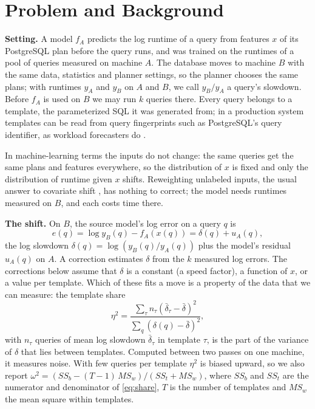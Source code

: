 \documentclass[conference]{IEEEtran}
\begin{document}
\section{Problem and Background}
\label{sec:problem}

\textbf{Setting.} A model $f_A$ predicts the log runtime of a query from
features $x$ of its PostgreSQL plan before the query runs, and was trained
on the runtimes of a pool of queries measured on machine $A$. The database
moves to machine $B$ with the same data, statistics and planner settings, so
the planner chooses the same plans; with runtimes $y_A$ and $y_B$ on $A$
and $B$, we call $y_B/y_A$ a query's slowdown.
Before $f_A$ is used on $B$ we may run $k$ queries there. Every query
belongs to a template, the parameterized SQL it was generated from; in a
production system templates can be read from query fingerprints such as
PostgreSQL's query identifier, as workload forecasters do
\cite{ma2018querybot}.

In machine-learning terms the inputs do not change: the same queries get
the same plans and features everywhere, so the distribution of $x$ is fixed
and only the distribution of runtime given $x$ shifts. Reweighting
unlabeled inputs, the usual answer to covariate shift
\cite{shimodaira2000}, has nothing to correct; the model needs runtimes
measured on $B$, and each costs time there.

\textbf{The shift.} On $B$, the source model's log error on a query $q$ is
\begin{equation}
e(q) = \log y_B(q) - f_A(x(q)) = \delta(q) + u_A(q),
\label{eq:error}
\end{equation}
the log slowdown $\delta(q) = \log(y_B(q)/y_A(q))$ plus the model's
residual $u_A(q)$ on $A$. A correction estimates $\delta$ from the $k$
measured log errors. The corrections below assume that $\delta$ is a constant
(a speed factor), a function of $x$, or a value per template. Which of
these fits a move is a property of the data that we can measure: the
template share
\begin{equation}
\eta^2 = \frac{\sum_{\tau} n_\tau(\bar\delta_\tau-\bar\delta)^2}{\sum_q(\delta(q)-\bar\delta)^2},
\label{eq:share}
\end{equation}
with $n_\tau$ queries of mean log slowdown $\bar\delta_\tau$ in template
$\tau$, is the part of the variance of $\delta$ that lies between
templates. Computed between two passes on one machine, it measures noise.
With few queries per template $\eta^2$ is biased upward, so we also report
$\omega^2=(SS_b-(T-1)\,MS_w)/(SS_t+MS_w)$, where $SS_b$ and $SS_t$ are the
numerator and denominator of \eqref{eq:share}, $T$ is the number of
templates and $MS_w$ the mean square within templates.
\end{document}
